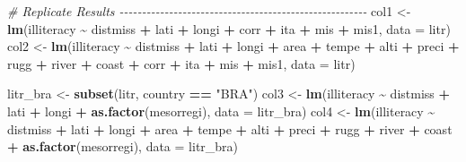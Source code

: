 \documentclass[
  a4paper,
]{article}
\newenvironment{Shaded}{\begin{snugshade}}{\end{snugshade}}
\newcommand{\AttributeTok}[1]{\textcolor[rgb]{0.13,0.29,0.53}{#1}}
\newcommand{\CommentTok}[1]{\textcolor[rgb]{0.56,0.35,0.01}{\textit{#1}}}
\newcommand{\FunctionTok}[1]{\textcolor[rgb]{0.13,0.29,0.53}{\textbf{#1}}}
\newcommand{\NormalTok}[1]{#1}
\newcommand{\OtherTok}[1]{\textcolor[rgb]{0.56,0.35,0.01}{#1}}
\newcommand{\SpecialCharTok}[1]{\textcolor[rgb]{0.81,0.36,0.00}{\textbf{#1}}}
\newcommand{\StringTok}[1]{\textcolor[rgb]{0.31,0.60,0.02}{#1}}
\begin{document}
\begin{Shaded}
\begin{Highlighting}[]
\CommentTok{\# Replicate Results {-}{-}{-}{-}{-}{-}{-}{-}{-}{-}{-}{-}{-}{-}{-}{-}{-}{-}{-}{-}{-}{-}{-}{-}{-}{-}{-}{-}{-}{-}{-}{-}{-}{-}{-}{-}{-}{-}{-}{-}{-}{-}{-}{-}{-}{-}{-}{-}{-}{-}{-}{-}{-}{-}{-}}
\NormalTok{col1 }\OtherTok{\textless{}{-}} \FunctionTok{lm}\NormalTok{(illiteracy }\SpecialCharTok{\textasciitilde{}}\NormalTok{ distmiss }\SpecialCharTok{+}\NormalTok{ lati }\SpecialCharTok{+}\NormalTok{ longi }\SpecialCharTok{+}\NormalTok{ corr }\SpecialCharTok{+}\NormalTok{ ita }\SpecialCharTok{+}\NormalTok{ mis }\SpecialCharTok{+}\NormalTok{ mis1, }\AttributeTok{data =}\NormalTok{ litr)}
\NormalTok{col2 }\OtherTok{\textless{}{-}} \FunctionTok{lm}\NormalTok{(illiteracy }\SpecialCharTok{\textasciitilde{}}\NormalTok{ distmiss }\SpecialCharTok{+}\NormalTok{ lati }\SpecialCharTok{+}\NormalTok{ longi }\SpecialCharTok{+}\NormalTok{ area }\SpecialCharTok{+}\NormalTok{ tempe }\SpecialCharTok{+}\NormalTok{ alti }\SpecialCharTok{+}\NormalTok{ preci }\SpecialCharTok{+}\NormalTok{ rugg }\SpecialCharTok{+}
\NormalTok{    river }\SpecialCharTok{+}\NormalTok{ coast }\SpecialCharTok{+}\NormalTok{ corr }\SpecialCharTok{+}\NormalTok{ ita }\SpecialCharTok{+}\NormalTok{ mis }\SpecialCharTok{+}\NormalTok{ mis1, }\AttributeTok{data =}\NormalTok{ litr)}

\NormalTok{litr\_bra }\OtherTok{\textless{}{-}} \FunctionTok{subset}\NormalTok{(litr, country }\SpecialCharTok{==} \StringTok{"BRA"}\NormalTok{)}
\NormalTok{col3 }\OtherTok{\textless{}{-}} \FunctionTok{lm}\NormalTok{(illiteracy }\SpecialCharTok{\textasciitilde{}}\NormalTok{ distmiss }\SpecialCharTok{+}\NormalTok{ lati }\SpecialCharTok{+}\NormalTok{ longi }\SpecialCharTok{+} \FunctionTok{as.factor}\NormalTok{(mesorregi), }\AttributeTok{data =}\NormalTok{ litr\_bra)}
\NormalTok{col4 }\OtherTok{\textless{}{-}} \FunctionTok{lm}\NormalTok{(illiteracy }\SpecialCharTok{\textasciitilde{}}\NormalTok{ distmiss }\SpecialCharTok{+}\NormalTok{ lati }\SpecialCharTok{+}\NormalTok{ longi }\SpecialCharTok{+}\NormalTok{ area }\SpecialCharTok{+}\NormalTok{ tempe }\SpecialCharTok{+}\NormalTok{ alti }\SpecialCharTok{+}\NormalTok{ preci }\SpecialCharTok{+}\NormalTok{ rugg }\SpecialCharTok{+}
\NormalTok{    river }\SpecialCharTok{+}\NormalTok{ coast }\SpecialCharTok{+} \FunctionTok{as.factor}\NormalTok{(mesorregi), }\AttributeTok{data =}\NormalTok{ litr\_bra)}


\end{Highlighting}
\end{Shaded}
\end{document}
